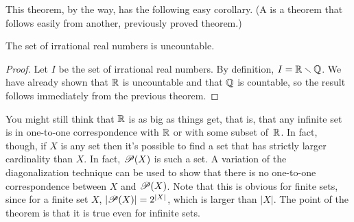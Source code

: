 This theorem, by the way, has the following easy corollary.
(A  is a theorem that follows easily from another,
previously proved theorem.)

\begin{corrolary}
The set of irrational real numbers is uncountable.
\end{corrolary}
\begin{proof}
Let $I$ be the set of irrational real numbers.  By
definition, $I={\mathbb R}\smallsetminus{\mathbb Q}$.  We have already shown that
${\mathbb R}$ is uncountable and that ${\mathbb Q}$ is countable, so the result
follows immediately from the previous theorem.
\end{proof}

\medbreak

You might still think that ${\mathbb R}$ is as big as things get, that is,
that any infinite set is in one-to-one correspondence with ${\mathbb R}$ or
with some subset of~${\mathbb R}$.  In fact, though, if $X$ is any set
then it's possible to find a set that has strictly larger
cardinality than $X$.  In fact, ${\mathscr P}(X)$ is such a set.
A variation of the diagonalization technique can be used to
show that there is no one-to-one correspondence between 
$X$ and ${\mathscr P}(X)$.  Note that this is obvious for finite
sets, since for a finite set $X$, $|{\mathscr P}(X)| = 2^{|X|}$,
which is larger than $|X|$.  The point of the theorem is that
it is true even for infinite sets.

